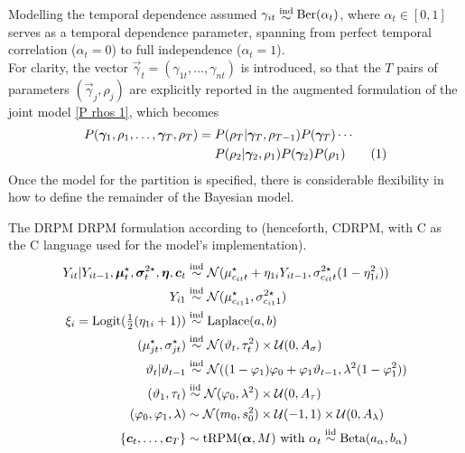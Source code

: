 \documentclass[
	11pt, %
 xcolor={dvipsnames,svgnames}
]{beamer}
\newcommand\numberthis{\addtocounter{equation}{1}\tag{\theequation}}
\begin{document}
\begin{frame}{Modelling the temporal dependence}
\citet{1-drpm} assumed $\gamma_{it} \mathrel{\raisebox{-2pt}{$\simind$}} \Ber(\alpha_t)$, where $\alpha_t \in [0,1]$ serves as a temporal dependence parameter, spanning from perfect temporal correlation ($\alpha_t=0$) to  full independence ($\alpha_t=1$). \\[6pt]
For clarity, the vector $\vec{\gamma}_t = (\gamma_{1t},\ldots,\gamma_{nt})$ is introduced, so that the $T$ pairs of parameters $(\vec{\gamma}_j,\rho_j)$ are explicitly reported in the augmented formulation of the joint model \eqref{P rhos 1}, which becomes
\begin{align*}
    P(\vec{\gamma}_1,\rho_1, \ldots, \vec{\gamma}_T,\rho_T) = &{}\; P(\rho_T|\vec{\gamma}_T,\rho_{T-1})P(\vec{\gamma}_T) \cdots\\ &{}\; P(\rho_2|\vec{\gamma}_2,\rho_1)P(\vec{\gamma}_2) P(\rho_1) 
\numberthis \label{trpm - P rhos 2}
\end{align*}
Once the model for the partition is specified, there is considerable flexibility in how to define the remainder of the Bayesian model.
\end{frame}

\begin{frame}{The DRPM}
DRPM formulation according to \citet{1-drpm} (henceforth, CDRPM, with C as the C language used for the model's implementation). %
{\small
    \begin{align*}
Y_{it}|Y_{it-1},\vec{\mu}^{\star}_t,\vec{\sigma}^{2\star}_t, \vec{\eta},\vec{c}_t &\simind \mathcal{N}(\mu_{c_{it}t}^\star+\eta_{1i}Y_{it-1},\sigma^{2\star}_{c_{it}t}(1-\eta_{1i}^2))  \\
Y_{i1} &\simind \mathcal{N}(\mu^\star_{c_{i1}1},\sigma^{2\star}_{c_{i1}1})\\
%
\xi_i = \text{Logit$(\tfrac{1}{2}(\eta_{1i}+1)$}) &\simind \text{Laplace$(a,b)$}\\
%
( \mu_{jt}^\star, \sigma_{jt}^\star) &\simind \N(\theta_t,\tau_t^2) \times \U(0,A_\sigma)\\
%
\theta_t | \theta_{t-1} &\simind \N((1-\phi_1)\phi_0 + \phi_1\theta_{t-1},\lambda^2(1-\phi_1^2))\\
%
(\theta_1,\tau_t) &\simiid \N(\phi_0,\lambda^2) \times \U(0,A_\tau)\\
%
(\phi_0,\phi_1,\lambda) &\sim \N(m_0,s_0^2) \times \U(-1,1) \times \U(0,A_\lambda)\\
%
\{\vec{c}_t, \ldots, \vec{c}_T\} &\sim \text{tRPM}(\vec{\alpha}, M) \text{ with } \alpha_t \simiid \text{Beta}(a_\alpha, b_\alpha)
\end{align*}
}
\end{frame}
\end{document}

